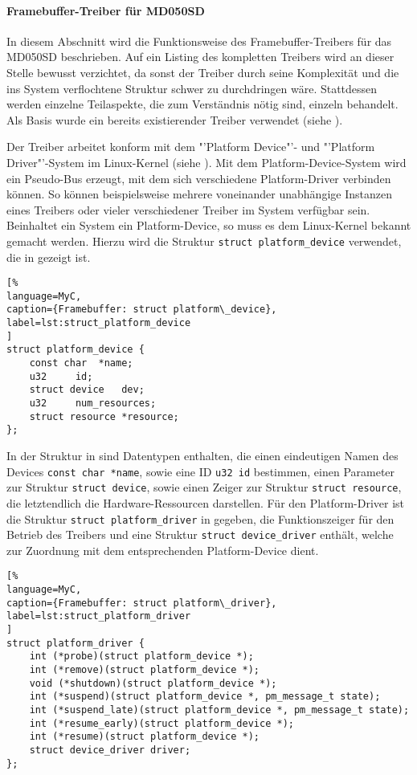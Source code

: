 \paragraph{Framebuffer-Treiber für MD050SD}
In diesem Abschnitt wird die Funktionsweise des Framebuffer-Treibers für das MD050SD beschrieben. Auf ein Listing des kompletten Treibers wird an dieser Stelle bewusst verzichtet, da sonst der Treiber durch seine Komplexität und die ins System verflochtene Struktur schwer zu durchdringen wäre. Stattdessen werden einzelne Teilaspekte, die zum Verständnis nötig sind, einzeln behandelt. Als Basis wurde ein bereits existierender Treiber verwendet (siehe \cite{Schlegel2013c}).

Der Treiber arbeitet konform mit dem "'Platform Device"'- und "'Platform Driver"'-System im Linux-Kernel (siehe \cite{LinuxKernelPlatformDeviceDriver}). Mit dem Platform-Device-System wird ein Pseudo-Bus erzeugt, mit dem sich verschiedene Platform-Driver verbinden können. So können beispielsweise mehrere voneinander unabhängige Instanzen eines Treibers oder vieler verschiedener Treiber im System verfügbar sein. Beinhaltet ein System ein Platform-Device, so muss es dem Linux-Kernel bekannt gemacht werden. Hierzu wird die Struktur \lstinline|struct platform_device| verwendet, die in  gezeigt ist.

\begin{lstlisting}[%
language=MyC,
caption={Framebuffer: struct platform\_device},
label=lst:struct_platform_device
]
struct platform_device {
	const char	*name;
	u32		id;
	struct device	dev;
	u32		num_resources;
	struct resource	*resource;
};
\end{lstlisting}

In der Struktur in  sind Datentypen enthalten, die einen eindeutigen Namen des Devices \lstinline|const char *name|, sowie eine ID \lstinline|u32 id|  bestimmen, einen Parameter zur Struktur \lstinline|struct device|, sowie einen Zeiger zur Struktur \lstinline|struct resource|, die letztendlich die Hardware-Ressourcen darstellen. Für den Platform-Driver ist die Struktur \lstinline|struct platform_driver| in  gegeben, die Funktionszeiger für den Betrieb des Treibers und eine Struktur \lstinline|struct device_driver| enthält, welche zur Zuordnung mit dem entsprechenden Platform-Device dient.
\begin{lstlisting}[%
language=MyC,
caption={Framebuffer: struct platform\_driver},
label=lst:struct_platform_driver
]
struct platform_driver {
	int (*probe)(struct platform_device *);
	int (*remove)(struct platform_device *);
	void (*shutdown)(struct platform_device *);
	int (*suspend)(struct platform_device *, pm_message_t state);
	int (*suspend_late)(struct platform_device *, pm_message_t state);
	int (*resume_early)(struct platform_device *);
	int (*resume)(struct platform_device *);
	struct device_driver driver;
};
\end{lstlisting}


